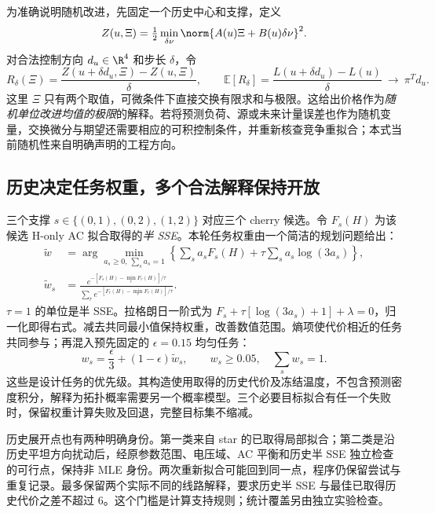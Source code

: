 为准确说明随机改进，先固定一个历史中心和支撑，定义
\[Z(u,\Xi)=\tfrac12\min_{\delta\nu}\norm{A(u)\Xi+B(u)\delta\nu}^2.\]
对合法控制方向 $d_u\in\R^4$ 和步长 $\delta$，令
\begin{equation}
 R_\delta(\Xi)=\frac{Z(u+\delta d_u,\Xi)-Z(u,\Xi)}{\delta},\qquad
 \mathbb E[R_\delta]=\frac{L(u+\delta d_u)-L(u)}{\delta}
 \ \longrightarrow\ \pi^Td_u.
 \label{si:random-unit}
\end{equation}
这里 $\Xi$ 只有两个取值，可微条件下直接交换有限求和与极限。这给出价格作为\emph{随机单位改进均值的极限}的解释。若将预测负荷、源或未来计量误差也作为随机变量，交换微分与期望还需要相应的可积控制条件，并重新核查竞争重拟合；本式当前随机性来自明确声明的工程方向。

\subsection{历史决定任务权重，多个合法解释保持开放}

三个支撑 $s\in\{(0,1),(0,2),(1,2)\}$ 对应三个 cherry 候选。令 $F_s(H)$ 为该候选 H-only AC 拟合取得的\emph{半 SSE}。本轮任务权重由一个简洁的规划问题给出：
\begin{align}
 \widetilde w&=\arg\min_{a_s\ge0,\,\sum_sa_s=1}
 \left\{\sum_sa_sF_s(H)+\tau\sum_sa_s\log(3a_s)\right\},\nonumber\\
 \widetilde w_s&=\frac{e^{-[F_s(H)-\min_rF_r(H)]/\tau}}
 {\sum_re^{-[F_r(H)-\min_rF_r(H)]/\tau}}.
 \label{si:entropy-tasks}
\end{align}
$\tau=1$ 的单位是半 SSE。拉格朗日一阶式为
$F_s+\tau[\log(3a_s)+1]+\lambda=0$，归一化即得右式。减去共同最小值保持权重，改善数值范围。熵项使代价相近的任务共同参与；再混入预先固定的 $\epsilon=0.15$ 均匀任务：
\begin{equation}
 w_s=\frac{\epsilon}{3}+(1-\epsilon)\widetilde w_s,\qquad
 w_s\ge0.05,\quad \sum_sw_s=1.
 \label{si:task-floor}
\end{equation}
这些是设计任务的优先级。其构造使用取得的历史代价及冻结温度，不包含预测密度积分，解释为拓扑概率需要另一个概率模型。三个必要目标拟合有任一个失败时，保留权重计算失败及回退，完整目标集不缩减。

历史展开点也有两种明确身份。第一类来自 star 的已取得局部拟合；第二类是沿历史平坦方向扰动后，经原参数范围、电压域、AC 平衡和历史半 SSE 独立检查的可行点，保持非 MLE 身份。两次重新拟合可能回到同一点，程序仍保留尝试与重复记录。最多保留两个实际不同的线路解释，要求历史半 SSE 与最佳已取得历史代价之差不超过 6。这个门槛是计算支持规则；统计覆盖另由独立实验检查。

